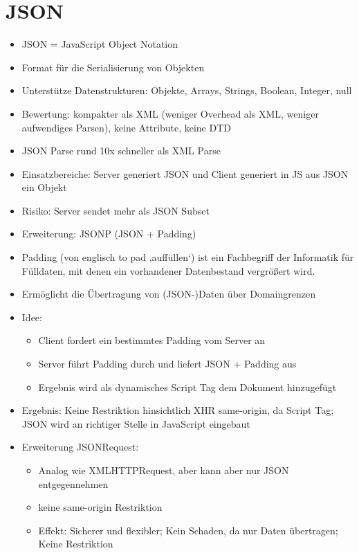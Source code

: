 \documentclass{article} %
\begin{document}
	
	
	\section{JSON}
	\begin{itemize}
		\item JSON = JavaScript Object Notation
		\item Format für die Serialisierung von Objekten
		\item Unterstütze Datenstrukturen: Objekte, Arrays, Strings, Boolean, Integer, null
		\item Bewertung: kompakter als XML (weniger Overhead als XML, weniger aufwendiges Parsen), keine Attribute, keine DTD
		\item JSON Parse rund 10x schneller als XML Parse
		\item Einsatzbereiche: Server generiert JSON und Client generiert in JS aus JSON ein Objekt
		\item Risiko: Server sendet mehr als JSON Subset
		\item Erweiterung: JSONP (JSON + Padding)
		\item Padding (von englisch to pad ‚auffüllen‘) ist ein Fachbegriff der Informatik für Fülldaten, mit denen ein vorhandener Datenbestand vergrößert wird.
		\item Ermöglicht die Übertragung von (JSON-)Daten über Domaingrenzen
		\item Idee: 
		\begin{itemize}
			\item Client fordert ein bestimmtes Padding vom Server an
			\item Server führt Padding durch und liefert JSON + Padding aus
			\item Ergebnis wird als dynamisches Script Tag dem Dokument hinzugefügt
		\end{itemize}
		\item Ergebnis: Keine Restriktion hinsichtlich XHR same-origin, da Script Tag; JSON wird an richtiger Stelle in JavaScript eingebaut
		\item Erweiterung JSONRequest:
		\begin{itemize}
			\item Analog wie XMLHTTPRequest, aber kann aber nur JSON entgegennehmen
			\item keine same-origin Restriktion
			\item Effekt: Sicherer und flexibler; Kein Schaden, da nur Daten übertragen; Keine Restriktion
		\end{itemize}
	\end{itemize}
\end{document}
